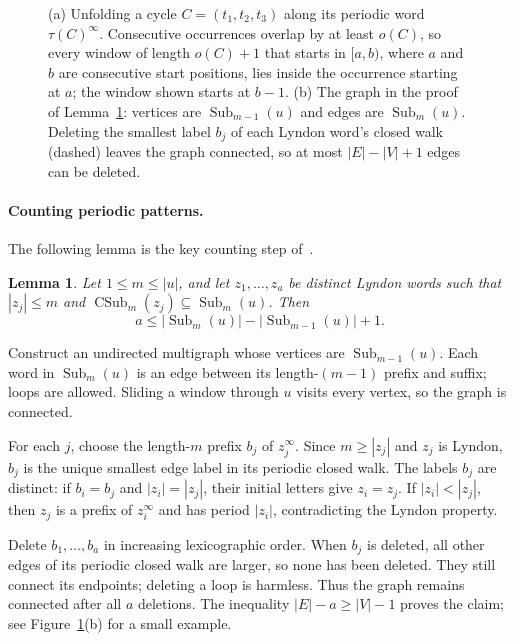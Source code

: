 \documentclass[11pt,a4paper]{article}   %
\makeatletter
\renewenvironment{proof}[1][\proofname]{\par
  \pushQED{\qed}%
  \normalfont \topsep1\p@\@plus1\p@\relax
  \trivlist
  \item[\hskip\labelsep\itshape #1\@addpunct{.}]\ignorespaces
}{\popQED\endtrivlist\@endpefalse}
\theoremstyle{compact}
\newtheorem{lemma}[theorem]{Lemma}
\theoremstyle{compactdef}
\newcommand{\str}[1]{\texttt{#1}}           %
\makeatother
\begin{document}
\begin{figure}[htb]
\caption{(a) Unfolding a cycle $C=(t_1,t_2,t_3)$ along its periodic word
$\tau(C)^\infty$. Consecutive occurrences overlap by at least $o(C)$, so
every window of length $o(C)+1$ that starts in $[a,b)$, where $a$ and $b$
are consecutive start positions, lies inside the occurrence starting at
$a$; the window shown starts at $b-1$. (b) The graph in the proof of
Lemma~\ref{lem:upper-periodic-count}: vertices are $\operatorname{Sub}_{m-1}(u)$
and edges are $\operatorname{Sub}_m(u)$. Deleting the smallest label $b_j$ of
each Lyndon word's closed walk (dashed) leaves the graph connected, so at
most $|E|-|V|+1$ edges can be deleted.}\label{fig:cycles}
\end{figure}

\paragraph{Counting periodic patterns.}
The following lemma is the key counting step of~\cite{CKMS26}.

\begin{lemma}\label{lem:upper-periodic-count}
Let $1\le m\le |u|$, and let $z_1,\ldots,z_a$ be distinct Lyndon words
such that $|z_j|\le m$ and
$\operatorname{CSub}_m(z_j)\subseteq\operatorname{Sub}_m(u)$.
Then
\[
  a\le |\operatorname{Sub}_m(u)|
       -|\operatorname{Sub}_{m-1}(u)|+1.
\]
\end{lemma}

\begin{proof}
Construct an undirected multigraph whose vertices are
$\operatorname{Sub}_{m-1}(u)$. Each word in $\operatorname{Sub}_m(u)$
is an edge between its length-$(m-1)$ prefix and suffix; loops are allowed.
Sliding a window through $u$ visits every vertex, so the graph is connected.

For each $j$, choose the length-$m$ prefix $b_j$ of $z_j^\infty$.
Since $m\ge |z_j|$ and $z_j$ is Lyndon, $b_j$ is the unique smallest
edge label in its periodic closed walk. The labels $b_j$ are distinct:
if $b_i=b_j$ and $|z_i|=|z_j|$, their initial letters give $z_i=z_j$.
If $|z_i|<|z_j|$, then $z_j$ is a prefix of $z_i^\infty$ and has period
$|z_i|$, contradicting the Lyndon property.

Delete $b_1,\ldots,b_a$ in increasing lexicographic order. When $b_j$
is deleted, all other edges of its periodic closed walk are larger,
so none has been deleted. They still connect its endpoints; deleting
a loop is harmless. Thus the graph remains connected after all $a$
deletions. The inequality $|E|-a\ge |V|-1$ proves the claim; see
Figure~\ref{fig:cycles}(b) for a small example.
\end{proof}
\end{document}
